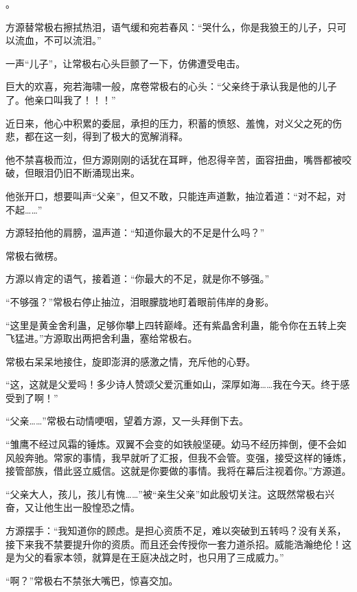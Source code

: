 
\begin{this_body}



。

方源替常极右擦拭热泪，语气缓和宛若春风：“哭什么，你是我狼王的儿子，只可以流血，不可以流泪。”

一声“儿子”，让常极右心头巨颤了一下，仿佛遭受电击。

巨大的欢喜，宛若海啸一般，席卷常极右的心头：“父亲终于承认我是他的儿子了。他亲口叫我了！！！”

近日来，他心中积累的委屈，承担的压力，积蓄的愤怒、羞愧，对义父之死的伤悲，都在这一刻，得到了极大的宽解消释。

他不禁喜极而泣，但方源刚刚的话犹在耳畔，他忍得辛苦，面容扭曲，嘴唇都被咬破，但眼泪仍旧不断涌现出来。

他张开口，想要叫声“父亲”，但又不敢，只能连声道歉，抽泣着道：“对不起，对不起……”

方源轻拍他的肩膀，温声道：“知道你最大的不足是什么吗？”

常极右微楞。

方源以肯定的语气，接着道：“你最大的不足，就是你不够强。”

“不够强？”常极右停止抽泣，泪眼朦胧地盯着眼前伟岸的身影。

“这里是黄金舍利蛊，足够你攀上四转巅峰。还有紫晶舍利蛊，能令你在五转上突飞猛进。”方源取出两把舍利蛊，塞给常极右。

常极右呆呆地接住，旋即澎湃的感激之情，充斥他的心野。

“这，这就是父爱吗！多少诗人赞颂父爱沉重如山，深厚如海……我在今天。终于感受到了啊！”

“父亲……”常极右动情哽咽，望着方源，又一头拜倒下去。

“雏鹰不经过风霜的锤炼。双翼不会变的如铁般坚硬。幼马不经历摔倒，便不会如风般奔驰。常家的事情，我早就听了汇报，但我不会管。变强，接受这样的锤炼，接管部族，借此竖立威信。这就是你要做的事情。我将在幕后注视着你。”方源道。

“父亲大人，孩儿，孩儿有愧……”被“亲生父亲”如此殷切关注。这既然常极右兴奋，又让他生出一股惶恐之情。

方源摆手：“我知道你的顾虑。是担心资质不足，难以突破到五转吗？没有关系，接下来我不禁要提升你的资质。而且还会传授你一套力道杀招。威能浩瀚绝伦！这是为父的看家本领，就算是在王庭决战之时，也只用了三成威力。”

“啊？”常极右不禁张大嘴巴，惊喜交加。


\end{this_body}
